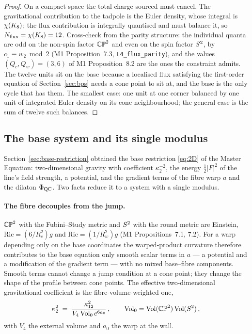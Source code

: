 \begin{proof}
On a compact space the total charge sourced must cancel. The gravitational
contribution to the tadpole is the Euler density, whose integral is
$\chi(K_8)$; the flux contribution is integrally quantised and must
balance it, so $N_{\mathrm{flux}}=\chi(K_8)=12$. Cross-check from the
parity structure: the individual quanta are odd on the non-spin factor
$\mathbb{CP}^2$ and even on the spin factor $S^2$, by $c_{1}\equiv w_{2}\bmod2$
(M1 Proposition~7.3, \texttt{L4\_flux\_parity}), and the values
$(Q_{c},Q_{w})=(3,6)$ of M1 Proposition~8.2 are the ones the constraint
admits. The twelve units sit on the base because a localised flux
satisfying the first-order equation of Section~\ref{sec:bps} needs a cone
point to sit at, and the base is the only cycle that has them. The
smallest case: one unit at one corner balanced by one unit of integrated
Euler density on its cone neighbourhood; the general case is the sum of
twelve such balances. \rigD
\end{proof}

\subsection{The base system and its single modulus}\label{sec:base-system}

Section~\ref{sec:base-restriction} obtained the base restriction
\eqref{eq:2D} of the Master Equation: two-dimensional gravity with
coefficient $\kappa_{2}^{-2}$, the energy $\tfrac12\lvert F\rvert^{2}$ of
the line's field strength, a potential, and the gradient terms of the
fibre warp $a$ and the dilaton $\Phi_{\mathrm{QC}}$. Two facts reduce it to a system with
a single modulus.

\paragraph{The fibre decouples from the jump.}
$\mathbb{CP}^2$ with the Fubini--Study metric and $S^2$ with the round metric
are Einstein, $\mathrm{Ric}=(6/R_{c}^{2})g$ and $\mathrm{Ric}=(1/R_{w}^{2})g$
(M1 Propositions~7.1, 7.2). For a warp depending only on the base
coordinates the warped-product curvature \cite{BishopONeill1969} therefore
contributes to the base equation only smooth scalar terms in $a$ --- a
potential and a modification of the gradient term --- with no mixed
base--fibre components. Smooth terms cannot change a jump condition at a
cone point; they change the shape of the profile between cone points.
The effective two-dimensional gravitational coefficient is the
fibre-volume-weighted one,
\begin{equation}\label{eq:kappa-eff}
  \kappa_{2}^{2}\;=\;\frac{\kappa_{12}^{2}}{V_{4}\,\mathrm{Vol}_{0}\,e^{6a_{0}}}\,,
  \qquad \mathrm{Vol}_{0}=\mathrm{Vol}(\mathbb{CP}^2)\,\mathrm{Vol}(S^2)\,,
\end{equation}
with $V_{4}$ the external volume and $a_{0}$ the warp at the wall. \rigD

